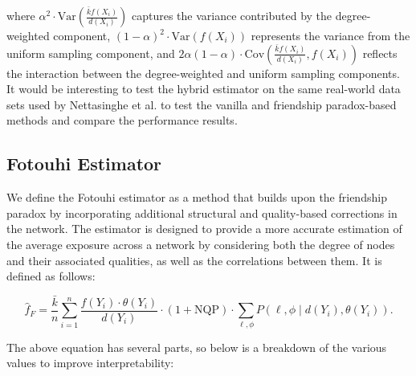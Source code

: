 \documentclass{article}
\begin{document}
\noindent where \( \alpha^2 \cdot \text{Var} \left( \frac{\bar{k} f(X_i)}{d(X_i)} \right) \) captures the variance contributed by the degree-weighted component, \( (1 - \alpha)^2 \cdot \text{Var}(f(X_i)) \) represents the variance from the uniform sampling component, and \( 2 \alpha (1 - \alpha) \cdot \text{Cov} \left( \frac{\bar{k} f(X_i)}{d(X_i)}, f(X_i) \right) \) reflects the interaction between the degree-weighted and uniform sampling components. It would be interesting to test the hybrid estimator on the same real-world data sets used by Nettasinghe et al. to test the vanilla and friendship paradox-based methods and compare the performance results.

\subsection{Fotouhi Estimator}

We define the Fotouhi estimator as a method that builds upon the friendship paradox by incorporating additional structural and quality-based corrections in the network. The estimator is designed to provide a more accurate estimation of the average exposure across a network by considering both the degree of nodes and their associated qualities, as well as the correlations between them. It is defined as follows:

\begin{equation}
\hat{f}_F = \frac{\bar{k}}{n} \sum_{i=1}^n \frac{f(Y_i) \cdot \theta(Y_i)}{d(Y_i)} \cdot (1 + \text{NQP}) \cdot \sum_{\ell, \phi} P(\ell, \phi \mid d(Y_i), \theta(Y_i)).
\end{equation}

The above equation has several parts, so below is a breakdown of the various values to improve interpretability:

\setlength{\leftmargini}{12pt}
\setlength{\labelsep}{0.5em}
\setlength{\itemindent}{-1.5em}
\end{document}
